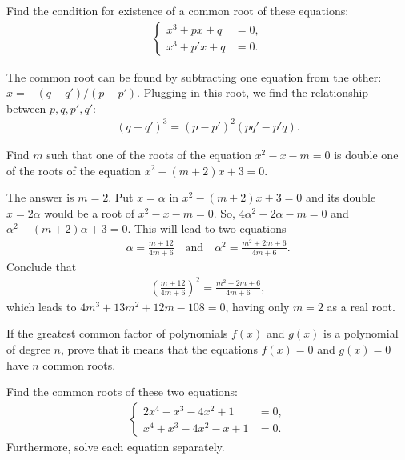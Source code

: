 \documentclass[12pt,a4paper]{memoir}
\theoremstyle{definition}
\begin{document}
\begin{question}
	Find the condition for existence of a common root of these equations:
	\begin{align*}
		\begin{cases}
			x^3+px+q &=0,\\x^3+p'x+q &=0.
		\end{cases}
	\end{align*}
\end{question}


\begin{solution}
	The common root can be found by subtracting one equation from the other: $x=-(q-q')/(p-p')$. Plugging in this root, we find the relationship between $p,q,p',q'$:
	\begin{align*}
		(q-q')^3 = (p-p')^2 (pq'-p'q).
	\end{align*}
\end{solution}



\begin{question}
	Find $m$ such that one of the roots of the equation $x^2-x-m=0$ is double one of the roots of the equation $x^2-(m+2)x+3=0$.
\end{question}

\begin{solution}
	The answer is $m=2$. Put $x=\alpha$ in $x^2-(m+2)x+3=0$ and its double $x=2\alpha$ would be a root of $x^2-x-m=0$. So, $4\alpha^2-2\alpha-m=0$ and $\alpha^2-(m+2)\alpha+3=0$. This will lead to two equations
	\begin{align*}
		\alpha = \frac{m+12}{4m+6} \quad \text{and} \quad \alpha^2=\frac{m^2+2m+6}{4m+6}.
	\end{align*}
	Conclude that
	\begin{align*}
		\left(\frac{m+12}{4m+6}\right)^2 = \frac{m^2+2m+6}{4m+6},
	\end{align*}
	which leads to $4m^3+13m^2+12m-108=0$, having only $m=2$ as a real root.
\end{solution}

\begin{tcolorbox}
	\begin{question}
		If the greatest common factor of polynomials $f(x)$ and $g(x)$ is a polynomial of degree $n$, prove that it means that the equations $f(x)=0$ and $g(x)=0$ have $n$ common roots.
	\end{question}
\end{tcolorbox}


\begin{question}
	Find the common roots of these two equations:
	\begin{align*}
		\begin{cases}
			2x^4-x^3-4x^2+1&=0,\\x^4+x^3-4x^2-x+1&=0.
		\end{cases}
	\end{align*}
	Furthermore, solve each equation separately. 
\end{question}
\end{document}
